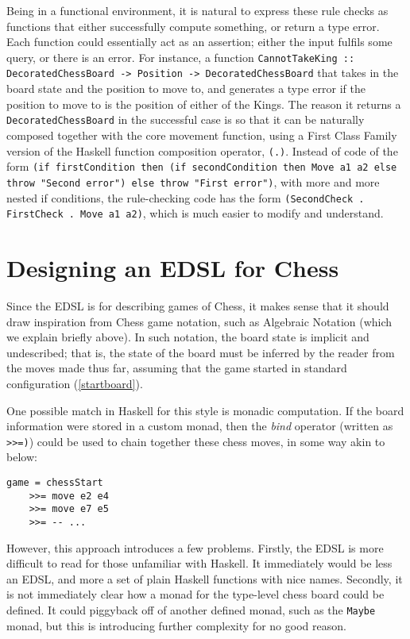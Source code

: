 \documentclass[12pt, a4paper, bibliography=totocnumbered]{scrreprt}
\newcommand{\inline}[1]{\lstinline[basicstyle=\ttfamily\footnotesize]{#1}}
\begin{document}
Being in a functional environment, it is natural to express these rule checks as functions that either successfully compute something, or return a type error. Each function could essentially act as an assertion; either the input fulfils some query, or there is an error. For instance, a function \inline{CannotTakeKing :: DecoratedChessBoard -> Position -> DecoratedChessBoard} that takes in the board state and the position to move to, and generates a type error if the position to move to is the position of either of the Kings. The reason it returns a \inline{DecoratedChessBoard} in the successful case is so that it can be naturally composed together with the core movement function, using a First Class Family version of the Haskell function composition operator, \inline{(.)}. Instead of code of the form \inline{(if firstCondition then (if secondCondition then Move a1 a2 else throw "Second error") else throw "First error")}, with more and more nested if conditions, the rule-checking code has the form \inline{(SecondCheck . FirstCheck . Move a1 a2)}, which is much easier to modify and understand.

\section{Designing an EDSL for Chess}

Since the EDSL is for describing games of Chess, it makes sense that it should draw inspiration from Chess game notation, such as Algebraic Notation (which we explain briefly above). In such notation, the board state is implicit and undescribed; that is, the state of the board must be inferred by the reader from the moves made thus far, assuming that the game started in standard configuration (\cref{startboard}).

One possible match in Haskell for this style is monadic computation. If the board information were stored in a custom monad, then the \emph{bind} operator (written as \inline{>>=)}) could be used to chain together these chess moves, in some way akin to below:

\begin{lstlisting}
game = chessStart
    >>= move e2 e4
    >>= move e7 e5
    >>= -- ...
\end{lstlisting}

However, this approach introduces a few problems. Firstly, the EDSL is more difficult to read for those unfamiliar with Haskell. It immediately would be less an EDSL, and more a set of plain Haskell functions with nice names. Secondly, it is not immediately clear how a monad for the type-level chess board could be defined. It could piggyback off of another defined monad, such as the \inline{Maybe} monad, but this is introducing further complexity for no good reason.
\end{document}

